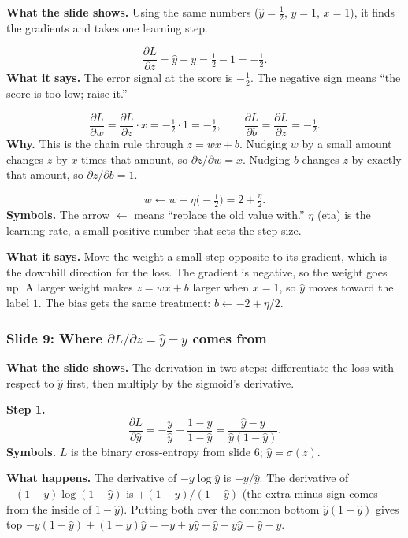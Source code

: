 \textbf{What the slide shows.} Using the same numbers ($\hat{y}=\tfrac12$, $y=1$, $x=1$), it finds the gradients and takes one learning step.

\[
\frac{\partial L}{\partial z} = \hat{y}-y = \tfrac12 - 1 = -\tfrac12 .
\]
\textbf{What it says.} The error signal at the score is $-\tfrac12$. The negative sign means ``the score is too low; raise it.''

\[
\frac{\partial L}{\partial w} = \frac{\partial L}{\partial z}\cdot x = -\tfrac12\cdot 1 = -\tfrac12, \qquad
\frac{\partial L}{\partial b} = \frac{\partial L}{\partial z} = -\tfrac12 .
\]
\textbf{Why.} This is the chain rule through $z = wx+b$. Nudging $w$ by a small amount changes $z$ by $x$ times that amount, so $\partial z/\partial w = x$. Nudging $b$ changes $z$ by exactly that amount, so $\partial z/\partial b = 1$.

\[
w \leftarrow w - \eta\Big(-\tfrac12\Big) = 2 + \tfrac{\eta}{2}.
\]
\textbf{Symbols.} The arrow $\leftarrow$ means ``replace the old value with.'' $\eta$ (eta) is the learning rate, a small positive number that sets the step size.

\textbf{What it says.} Move the weight a small step opposite to its gradient, which is the downhill direction for the loss. The gradient is negative, so the weight goes up. A larger weight makes $z = wx+b$ larger when $x=1$, so $\hat{y}$ moves toward the label $1$. The bias gets the same treatment: $b \leftarrow -2+\eta/2$.

\subsubsection{Slide 9: Where $\partial L/\partial z = \hat{y}-y$ comes from}

\textbf{What the slide shows.} The derivation in two steps: differentiate the loss with respect to $\hat{y}$ first, then multiply by the sigmoid's derivative.

\textbf{Step 1.}
\[
\frac{\partial L}{\partial \hat{y}} = -\frac{y}{\hat{y}} + \frac{1-y}{1-\hat{y}} = \frac{\hat{y}-y}{\hat{y}(1-\hat{y})}.
\]
\textbf{Symbols.} $L$ is the binary cross-entropy from slide 6; $\hat{y}=\sigma(z)$.

\textbf{What happens.} The derivative of $-y\log\hat{y}$ is $-y/\hat{y}$. The derivative of $-(1-y)\log(1-\hat{y})$ is $+(1-y)/(1-\hat{y})$ (the extra minus sign comes from the inside of $1-\hat{y}$). Putting both over the common bottom $\hat{y}(1-\hat{y})$ gives top $-y(1-\hat{y}) + (1-y)\hat{y} = -y + y\hat{y} + \hat{y} - y\hat{y} = \hat{y}-y$.

